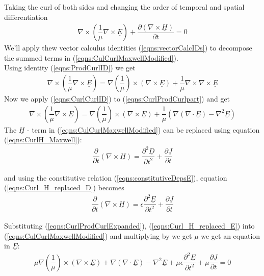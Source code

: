 \documentclass[12pt,twoside]{article}
\begin{document}
Taking the curl of both sides and changing the order of temporal and spatial differentiation
\begin{align}
\label{eqns:CulCurlMaxwellModified}
\nabla \times \left( \dfrac{1}{\mu} \nabla \times \underline{E} \right)  + \dfrac{\partial (\nabla \times  \underline{H})}{\partial t} = 0
\end{align}
We'll apply thew vector calculus identities (\ref{eqns:vectorCalcIDs}) to decompose the summed terms in (\ref{eqns:CulCurlMaxwellModified}).\\
Using identity (\ref{eqns:ProdCurlID}) we get
\begin{align}
\label{eqns:CurlProdCurlpart}
\nabla \times \left( \dfrac{1}{\mu} \nabla \times \underline{E} \right) = \nabla \left( \dfrac{1}{\mu} \right) \times \left(\nabla \times \underline{E} \right) + \dfrac{1}{\mu} \nabla \times \nabla \times \underline{E}
\end{align}
Now we apply (\ref{eqns:CurlCurlID}) to (\ref{eqns:CurlProdCurlpart}) and get
\begin{align}
\label{eqns:CurlProdCurlExpanded}
\nabla \times \left( \dfrac{1}{\mu} \nabla \times \underline{E} \right) = \nabla \left( \dfrac{1}{\mu} \right) \times \left(\nabla \times \underline{E} \right) + \dfrac{1}{\mu} \left( \nabla (\nabla \cdot \underline{E}) - \nabla^2 \underline{E}\right)
\end{align}
The $\underline{H}$ - term in (\ref{eqns:CulCurlMaxwellModified}) can be replaced using equation (\ref{eqns:CurlH_Maxwell}):
\begin{align}
\label{eqns:Curl_H_replaced_D}
\dfrac{\partial}{\partial t} \left( \nabla \times \underline{H}\right) = \dfrac{\partial^2 \underline{D}}{\partial t^2} + \dfrac{\partial \underline{J}}{\partial t}
\end{align}

and using the constitutive relation (\ref{eqns:constitutiveDepsE}), equation (\ref{eqns:Curl_H_replaced_D}) becomes
\begin{align}
\label{eqns:Curl_H_replaced_E}
\dfrac{\partial}{\partial t} \left( \nabla \times \underline{H}\right) = \epsilon\dfrac{\partial^2 \underline{E}}{\partial t^2} + \dfrac{\partial \underline{J}}{\partial t}
\end{align}

Substituting (\ref{eqns:CurlProdCurlExpanded}), (\ref{eqns:Curl_H_replaced_E}) into (\ref{eqns:CulCurlMaxwellModified}) and multiplying by we get $\mu$ we get an equation in $\underline{E}$:
\begin{align}
\label{eqns:E_Wave_full}
\mu \nabla \left( \dfrac{1}{\mu} \right) \times \left(\nabla \times \underline{E} \right) +  \nabla (\nabla \cdot \underline{E}) - \nabla^2 \underline{E} + \mu \epsilon\dfrac{\partial^2 \underline{E}}{\partial t^2} + \mu \dfrac{\partial \underline{J}}{\partial t} = 0
\end{align}
\end{document}
